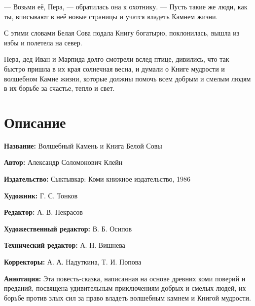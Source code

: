 \documentclass[12pt, a4paper, openany]{book}
\begin{document}
	— Возьми её, Пера, — обратилась она к охотнику. — Пусть такие же люди, как ты, вписывают в неё новые страницы и учатся владеть Камнем жизни.
	
	С этими словами Белая Сова подала Книгу богатырю, поклонилась, вышла из избы и полетела на север.
	
	Пера, дед Иван и Марпида долго смотрели вслед птице, дивились, что так быстро пришла в их края солнечная весна, и думали о Книге мудрости и волшебном Камне жизни, которые должны помочь всем добрым и смелым людям в их борьбе за счастье, тепло и свет.
	
	\newpage
	\tableofcontents
	
	\thispagestyle{empty} %
	
	\newpage
	
	\setcounter{secnumdepth}{0}  
	
	
		\section*{Описание}
	
	{\bf Название:} Волшебный Камень и Книга Белой Совы
	
{\bf Автор:} Александр Соломонович Клейн
	
{\bf Издательство:} Сыктывкар: Коми книжное издательство, 1986
	
		{\bf Художник:} Г. С. Тонков
	
		{\bf Редактор:} А. В. Некрасов
	
		{\bf Художественный редактор:} В. Б. Осипов
	
		{\bf Технический редактор:} А. Н. Вишнева
	
		{\bf Корректоры:} А. А. Надуткина, Т. И. Попова
	
		{\bf Аннотация:} Эта повесть-сказка, написанная на основе древних коми поверий и преданий, посвящена удивительным приключениям добрых и смелых людей, их борьбе против злых сил за право владеть волшебным камнем и Книгой мудрости.
		\thispagestyle{empty} %

	
\end{document}
